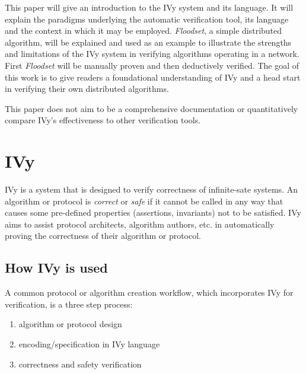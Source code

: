 \documentclass[fleqn]{article}
\begin{document}
  This paper will give an introduction to the IVy system and its language. It will explain the paradigms underlying the automatic verification tool, its language and the context in which it may be employed.  \textit{Floodset}, a simple distributed algorithm, will be explained and used as an example to illustrate the strengths and limitations of the IVy system in verifying algorithms operating in a network. First \textit{Floodset} will be manually proven and then deductively verified.  The goal of this work is to give readers a foundational understanding of IVy and a head start in verifying their own distributed algorithms.

  This paper does not aim to be a comprehensive documentation or quantitatively compare IVy's effectiveness to other verification tools.

\section{IVy}
IVy is a system that is designed to verify correctness of infinite-sate systems.
An algorithm or protocol is \textit{correct} or \textit{safe} if it cannot be called in any way that causes some pre-defined properties (assertions, invariants) not to be satisfied.
IVy aims to assist protocol architects, algorithm authors, etc. in automatically proving the correctness of their algorithm or protocol.

\subsection{How IVy is used}

A common protocol or algorithm creation workflow, which incorporates IVy for verification, is a three step process:

\begin{enumerate}
  \item algorithm or protocol design
  \item encoding/specification in IVy language
  \item correctness and safety verification
\end{enumerate}
\end{document}
